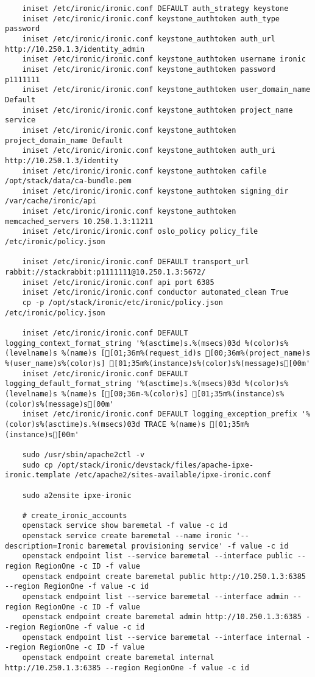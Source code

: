 \documentclass[a4paper,left=1.5cm,right=1.5cm,11pt]{article}
\begin{document}
\begin{lstlisting}
	iniset /etc/ironic/ironic.conf DEFAULT auth_strategy keystone
	iniset /etc/ironic/ironic.conf keystone_authtoken auth_type password
    iniset /etc/ironic/ironic.conf keystone_authtoken auth_url http://10.250.1.3/identity_admin
    iniset /etc/ironic/ironic.conf keystone_authtoken username ironic
    iniset /etc/ironic/ironic.conf keystone_authtoken password p1111111
    iniset /etc/ironic/ironic.conf keystone_authtoken user_domain_name Default
    iniset /etc/ironic/ironic.conf keystone_authtoken project_name service
    iniset /etc/ironic/ironic.conf keystone_authtoken project_domain_name Default
    iniset /etc/ironic/ironic.conf keystone_authtoken auth_uri http://10.250.1.3/identity
    iniset /etc/ironic/ironic.conf keystone_authtoken cafile /opt/stack/data/ca-bundle.pem
    iniset /etc/ironic/ironic.conf keystone_authtoken signing_dir /var/cache/ironic/api
    iniset /etc/ironic/ironic.conf keystone_authtoken memcached_servers 10.250.1.3:11211
    iniset /etc/ironic/ironic.conf oslo_policy policy_file /etc/ironic/policy.json

	iniset /etc/ironic/ironic.conf DEFAULT transport_url rabbit://stackrabbit:p1111111@10.250.1.3:5672/
	iniset /etc/ironic/ironic.conf api port 6385
    iniset /etc/ironic/ironic.conf conductor automated_clean True
	cp -p /opt/stack/ironic/etc/ironic/policy.json /etc/ironic/policy.json

	iniset /etc/ironic/ironic.conf DEFAULT logging_context_format_string '%(asctime)s.%(msecs)03d %(color)s%(levelname)s %(name)s [[01;36m%(request_id)s [00;36m%(project_name)s %(user_name)s%(color)s] [01;35m%(instance)s%(color)s%(message)s[00m'
    iniset /etc/ironic/ironic.conf DEFAULT logging_default_format_string '%(asctime)s.%(msecs)03d %(color)s%(levelname)s %(name)s [[00;36m-%(color)s] [01;35m%(instance)s%(color)s%(message)s[00m'
	iniset /etc/ironic/ironic.conf DEFAULT logging_exception_prefix '%(color)s%(asctime)s.%(msecs)03d TRACE %(name)s [01;35m%(instance)s[00m'

	sudo /usr/sbin/apache2ctl -v
	sudo cp /opt/stack/ironic/devstack/files/apache-ipxe-ironic.template /etc/apache2/sites-available/ipxe-ironic.conf

	sudo a2ensite ipxe-ironic

	# create_ironic_accounts
	openstack service show baremetal -f value -c id
    openstack service create baremetal --name ironic '--description=Ironic baremetal provisioning service' -f value -c id
	openstack endpoint list --service baremetal --interface public --region RegionOne -c ID -f value
	openstack endpoint create baremetal public http://10.250.1.3:6385 --region RegionOne -f value -c id
	openstack endpoint list --service baremetal --interface admin --region RegionOne -c ID -f value
	openstack endpoint create baremetal admin http://10.250.1.3:6385 --region RegionOne -f value -c id
	openstack endpoint list --service baremetal --interface internal --region RegionOne -c ID -f value
	openstack endpoint create baremetal internal http://10.250.1.3:6385 --region RegionOne -f value -c id
	

\end{lstlisting}
\end{document}
